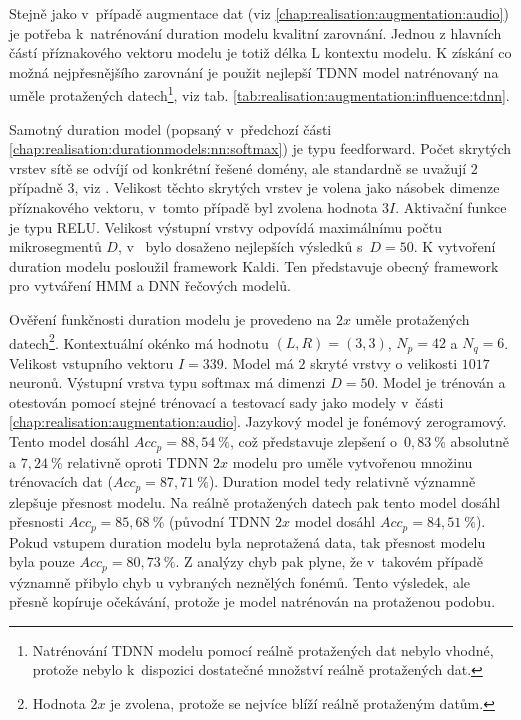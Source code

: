 Stejně jako v~případě augmentace dat (viz \ref{chap:realisation:augmentation:audio}) je potřeba  k~natrénování duration modelu kvalitní zarovnání. Jednou z hlavních částí příznakového vektoru modelu je totiž délka L kontextu modelu. K získání co možná nejpřesnějšího zarovnání je použit nejlepší TDNN model natrénovaný na uměle protažených datech\footnote{Natrénování TDNN modelu pomocí reálně protažených dat nebylo vhodné, protože nebylo  k~dispozici dostatečné množství reálně protažených dat.}, viz tab. \ref{tab:realisation:augmentation:influence:tdnn}.

Samotný duration model (popsaný v~předchozí části \ref{chap:realisation:durationmodels:nn:softmax}) je typu feedforward.  Počet skrytých vrstev sítě se odvíjí od konkrétní řešené domény, ale standardně se uvažují $2$ případně $3$, viz \cite{Hadian2017}. Velikost těchto skrytých vrstev je volena jako násobek dimenze příznakového vektoru, v~tomto případě byl zvolena hodnota $3I$. Aktivační funkce je typu RELU. Velikost výstupní vrstvy odpovídá maximálnímu počtu mikrosegmentů $D$, v~\cite{Hadian2017} bylo dosaženo nejlepších výsledků s~$D=50$. K vytvoření duration modelu posloužil framework Kaldi. Ten představuje obecný framework pro vytváření HMM a DNN řečových modelů.

Ověření funkčnosti duration modelu je provedeno na $2x$ uměle protažených datech\footnote{Hodnota $2x$ je zvolena, protože se nejvíce blíží reálně protaženým datům.}. Kontextuální okénko má hodnotu $\left(L, R\right) = \left(3, 3\right)$, $N_{p} = 42$ a $N_{q} = 6$. Velikost vstupního vektoru $I = 339$. Model má $2$ skryté vrstvy o velikosti $1017$ neuronů. Výstupní vrstva typu softmax má dimenzi $D=50$. Model je trénován a otestován pomocí stejné trénovací a testovací sady jako modely v~části \ref{chap:realisation:augmentation:audio}. Jazykový model je fonémový zerogramový. Tento model dosáhl $Acc_{p} = 88,54\ \%$, což představuje zlepšení o~$0,83\ \%$ absolutně a $7,24\ \%$ relativně oproti TDNN $2x$ modelu pro uměle vytvořenou množinu trénovacích dat ($Acc_{p} = 87,71\ \%$). Duration model tedy relativně významně zlepšuje přesnost modelu. Na reálně protažených datech pak tento model dosáhl přesnosti $Acc_{p} = 85,68\ \%$ (původní TDNN $2x$ model dosáhl $Acc_{p} = 84,51\ \%$). Pokud vstupem duration modelu byla neprotažená data, tak přesnost modelu byla pouze $Acc_{p} = 80,73\ \%$. Z analýzy chyb pak plyne, že v~takovém případě významně přibylo chyb u vybraných neznělých fonémů. Tento výsledek, ale přesně kopíruje očekávání, protože je model natrénován na protaženou podobu.


